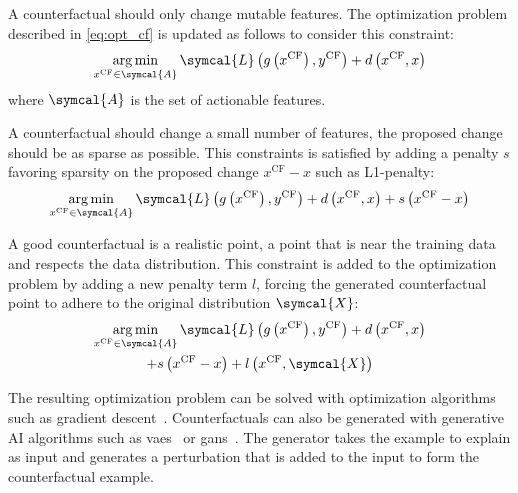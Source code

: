 \documentclass[../main.tex]{subfiles}
\begin{document}
	\begin{description}[
	        style=multiline,
	        leftmargin=!,
	        labelwidth=3cm,
	    ]
	    \item[Actionnability\label{item:cf_actionability}]
		    A counterfactual should only change mutable features.
		    The optimization problem described in \cref{eq:opt_cf} is updated as follows to consider this constraint:
		    \[\argmin_{x^{\text{CF}} \in \symcal{A}} \symcal{L}\left(g\left(x^{\text{CF}}\right), y^{\text{CF}} \right) + d\left(x^{\text{CF}}, x\right)\]
		    where \(\symcal{A}\) is the set of actionable features.
	    \item[Sparsity\label{item:cf_sparse}]
		    A counterfactual should change a small number of features, \ie{}the proposed change should be as sparse as possible.
		    This constraints is satisfied by adding a penalty \(s\) favoring sparsity on the proposed change \(x^{\text{CF}} - x\) such as L1-penalty:
		    \begin{equation*}
		        \argmin_{x^{\text{CF}} \in \symcal{A}} \symcal{L}\left(g\left(x^{\text{CF}}\right), y^{\text{CF}} \right) + d\left(x^{\text{CF}}, x\right) + s\left(x^{\text{CF}}-x\right)
		    \end{equation*}
	    \item[Data manifold closeness\label{item:cf_data_manifold}]
		    A good counterfactual is a realistic point, a point that is near the training data and respects the data distribution.
		    This constraint is added to the optimization problem by adding a new penalty term \(l\), forcing the generated counterfactual point to adhere to the original distribution \(\symcal{X}\):
		    \begin{multline*}
		        \argmin_{x^{\text{CF}} \in \symcal{A}} \symcal{L}\left(g\left(x^{\text{CF}}\right), y^{\text{CF}} \right) + d\left(x^{\text{CF}}, x\right)\\ + s\left(x^{\text{CF}}-x\right) + l\left(x^{\text{CF}}, \symcal{X}\right)
		    \end{multline*}
	\end{description}
	The resulting optimization problem can be solved with optimization algorithms such as gradient descent~\cite{wachter2017counterfactual}.
	Counterfactuals can also be generated with generative AI algorithms such as \glspl{vae}~\cite{mahajan2020preservingcausalconstraintscounterfactual} or \glspl{gan}~\cite{CounteRGAN,vanlooveren2021conditionalgenerativemodelscounterfactual,Yang2021ModelBasedCS}.
	The generator takes the example to explain as input and generates a perturbation that is added to the input to form the counterfactual example.
\end{document}

